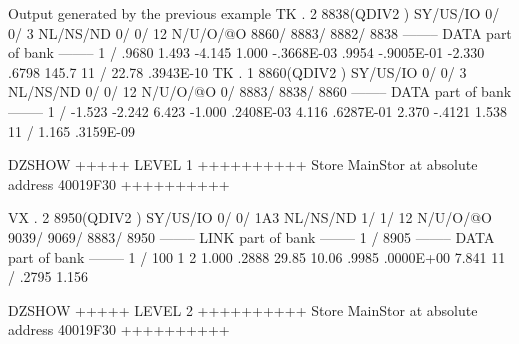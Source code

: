 \begin{landscapebody}
\begin{XMPt}{Output generated by the previous example}
 TK  .     2     8838(QDIV2   ) SY/US/IO    0/    0/   3 NL/NS/ND    0/    0/      12 N/U/O/@O    8860/    8883/    8882/    8838
--------  DATA part of bank  --------                                                                                            
      1 /   .9680       1.493      -4.145       1.000      -.3668E-03   .9954      -.9005E-01  -2.330       .6798       145.7    
     11 /   22.78       .3943E-10                                                                                                
 TK  .     1     8860(QDIV2   ) SY/US/IO    0/    0/   3 NL/NS/ND    0/    0/      12 N/U/O/@O       0/    8883/    8838/    8860
--------  DATA part of bank  --------                                                                                            
      1 /  -1.523      -2.242       6.423      -1.000       .2408E-03   4.116       .6287E-01   2.370      -.4121       1.538    
     11 /   1.165       .3159E-09                                                                                                
                                                                                                                                 
DZSHOW  +++++ LEVEL     1 ++++++++++            Store  MainStor at absolute address 40019F30      ++++++++++                     
                                                                                                                                 
 VX  .     2     8950(QDIV2   ) SY/US/IO    0/    0/ 1A3 NL/NS/ND    1/    1/      12 N/U/O/@O    9039/    9069/    8883/    8950
--------  LINK part of bank  --------                                                                                            
      1 /        8905                                                                                                            
--------  DATA part of bank  --------                                                                                            
      1 /         100           1           2   1.000       .2888       29.85       10.06       .9985       .0000E+00   7.841    
     11 /   .2795       1.156                                                                                                    
                                                                                                                                 
DZSHOW  +++++ LEVEL     2 ++++++++++            Store  MainStor at absolute address 40019F30      ++++++++++                     
                                                                                                                                 

\end{XMPt}
\end{landscapebody}
